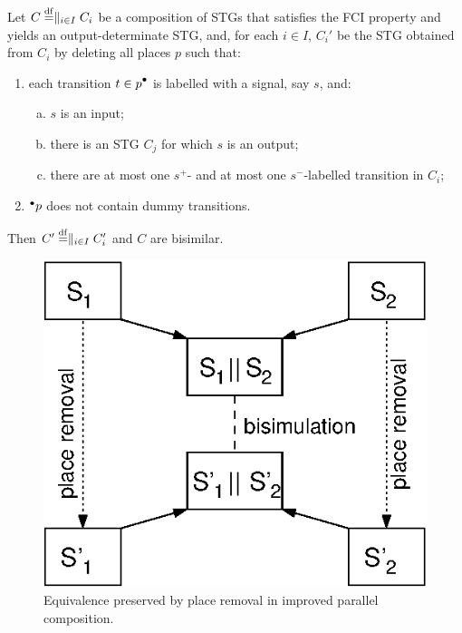 \begin{proposition}\label{pr-main}
Let $C\stackrel{\mathrm{df}}{=}\parallel_{i\in I}C_{i}$ be a composition of STGs
that satisfies the FCI property and yields an
output-determinate STG, and, for each $i\in I$, $C_{i}'$ be the
STG obtained from $C_{i}$ by deleting all places $p$ such that:
\begin{enumerate}[1.]
\item each transition $t\in\post{p}$ is labelled with a
    signal, say $s$, and:
\begin{enumerate}[a)]
\item\label{only-inputs-in-postset} $s$ is an input;
\item\label{exists-matching-output} there is an STG $C_j$ for which $s$ is an output;
\item\label{injective-labelling} there are at most one
    $s^+$- and at most one $s^-$-la\-bel\-led
    transition in $C_i$;
\end{enumerate}
\item\label{no-dummies-in-preset} ${}^\bullet {p}$ does not
    contain dummy transitions.
\end{enumerate}
Then $C'\stackrel{\mathrm{df}}{=}\parallel_{i\in I}C_i'$ and $C$ are bisimilar.
\end{proposition}

\begin{figure}[!tb]
  \centering
    \includegraphics[scale=1]{fig/parallel_composition}
  \caption[Equivalence preservation by improved parallel composition]{\label{fi-parcomp-improvement-theorem}
    Equivalence preserved by place removal in improved parallel composition.
  }
\end{figure}

